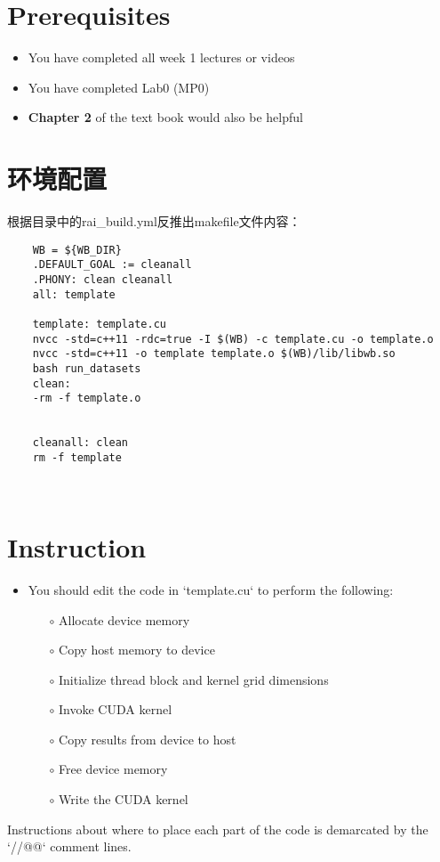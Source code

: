 \documentclass[11pt]{ctexart}
\begin{document}
\section{Prerequisites}
\begin{itemize}
	\item You have completed all week 1 lectures or videos
	\item You have completed Lab0 (MP0)
	\item \textbf{Chapter 2 }of the text book would also be helpful
\end{itemize}

\section{环境配置}
根据目录中的rai\_build.yml反推出makefile文件内容：

\begin{lstlisting}
	WB = ${WB_DIR}
	.DEFAULT_GOAL := cleanall
	.PHONY: clean cleanall
	all: template
	
	template: template.cu
	nvcc -std=c++11 -rdc=true -I $(WB) -c template.cu -o template.o
	nvcc -std=c++11 -o template template.o $(WB)/lib/libwb.so
	bash run_datasets
	clean:
	-rm -f template.o
	
	
	cleanall: clean
	rm -f template
	
	
\end{lstlisting}

\section{Instruction}
\begin{itemize}
	\item You should edit the code in `template.cu` to perform the following:
	\begin{itemize}
		\item[$\circ$] Allocate device memory
		\item[$\circ$] Copy host memory to device
		\item[$\circ$] Initialize thread block and kernel grid dimensions
		\item[$\circ$] Invoke CUDA kernel
		\item[$\circ$] Copy results from device to host
		\item[$\circ$] Free device memory
		\item[$\circ$]  Write the CUDA kernel
	\end{itemize}
\end{itemize}

Instructions about where to place each part of the code is
demarcated by the `//@@` comment lines.
\end{document}

